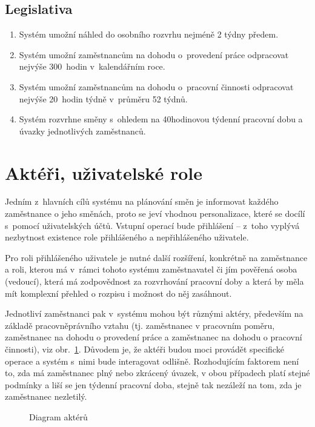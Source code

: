 \documentclass[twoside]{ctuthesis}
\begin{document}
\subsection{Legislativa}
\begin{enumerate}[label=\textbf{L\arabic*.}]
		\item Systém umožní náhled do osobního rozvrhu nejméně 2 týdny předem.
		\item Systém umožní zaměstnancům na dohodu o~provedení práce odpracovat nejvýše 300~hodin v~kalendářním roce.
		\item Systém umožní zaměstnancům na dohodu o~pracovní činnosti odpracovat nejvýše 20~hodin týdně v~průměru 52 týdnů.
		\item Systém rozvrhne směny s~ohledem na 40hodinovou týdenní pracovní dobu a úvazky jednotlivých zaměstnanců.
\end{enumerate}

\section{Aktéři, uživatelské role}
Jedním z~hlavních cílů systému na plánování směn je informovat každého zaměstnance o jeho směnách, proto se jeví vhodnou personalizace, které se docílí s~pomocí uživatelských účtů. Vstupní operací bude přihlášení -- z~toho vyplývá nezbytnost existence role přihlášeného a nepřihlášeného uživatele.

Pro roli přihlášeného uživatele je nutné další rozšíření, konkrétně na zaměstnance a roli, kterou má v~rámci tohoto systému za\-měst\-na\-va\-tel či jím pověřená osoba (vedoucí), která má zodpovědnost za rozvrhování pracovní doby a která by měla mít komplexní přehled o rozpisu i možnost do něj zasáhnout.

Jednotliví zaměstnanci pak v~systému mohou být různými aktéry, především na základě pracovněprávního vztahu (tj. zaměstnanec v pracovním poměru, zaměstnanec na dohodu o provedení práce a zaměstnanec na dohodu o pracovní činnosti), viz obr.~\ref{fig:userroles}. Důvodem je, že aktéři budou moci provádět specifické operace a systém s~nimi bude interagovat odlišně. Rozhodujícím faktorem není to, zda má zaměstnanec plný nebo zkrácený úvazek, v obou případech platí stejné podmínky a liší se jen týdenní pracovní doba, stejně tak nezáleží na tom, zda je zaměstnanec nezletilý.

\begin{figure}[h]
	
	\caption{Diagram aktérů}
	\label{fig:userroles}
\end{figure}
\end{document}
